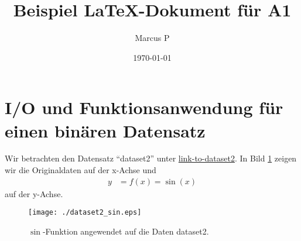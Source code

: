 \documentclass[11pt]{article}
\begin{document}
\title{
Beispiel \LaTeX-Dokument f\"ur A1
}

\author{
  Marcus P
}

\date{\today}
\maketitle

\section{I/O und Funktionsanwendung f\"ur einen bin\"aren Datensatz}

Wir betrachten den Datensatz ``dataset2'' unter \url{link-to-dataset2}. In Bild \ref{fig:1} zeigen wir die Originaldaten auf der x-Achse und
\begin{align}
  y &= f(x) =\sin\left( x \right)
  \label{eq:1}
\end{align}
auf der y-Achse.
\begin{figure}[htpb]
  \centering
  \texttt{[image: ./dataset2\_sin.eps]}
  \caption{$\sin$-Funktion angewendet auf die Daten dataset2.}
  \label{fig:1}
\end{figure}
\end{document}
